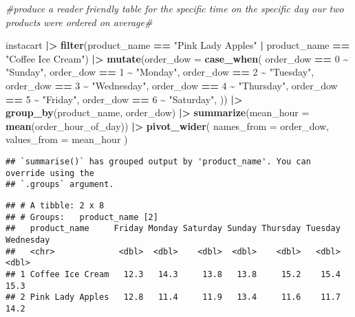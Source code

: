 \documentclass[
]{article}
\newenvironment{Shaded}{\begin{snugshade}}{\end{snugshade}}
\newcommand{\AttributeTok}[1]{\textcolor[rgb]{0.13,0.29,0.53}{#1}}
\newcommand{\CommentTok}[1]{\textcolor[rgb]{0.56,0.35,0.01}{\textit{#1}}}
\newcommand{\DecValTok}[1]{\textcolor[rgb]{0.00,0.00,0.81}{#1}}
\newcommand{\FunctionTok}[1]{\textcolor[rgb]{0.13,0.29,0.53}{\textbf{#1}}}
\newcommand{\NormalTok}[1]{#1}
\newcommand{\SpecialCharTok}[1]{\textcolor[rgb]{0.81,0.36,0.00}{\textbf{#1}}}
\newcommand{\StringTok}[1]{\textcolor[rgb]{0.31,0.60,0.02}{#1}}
\begin{document}
\begin{Shaded}
\begin{Highlighting}[]
\CommentTok{\#produce a reader friendly table for the specific time on the specific day our two products were ordered on average\#}

\NormalTok{instacart }\SpecialCharTok{|\textgreater{}} \FunctionTok{filter}\NormalTok{(product\_name }\SpecialCharTok{==} \StringTok{"Pink Lady Apples"} \SpecialCharTok{|}\NormalTok{ product\_name }\SpecialCharTok{==} \StringTok{"Coffee Ice Cream"}\NormalTok{) }\SpecialCharTok{|\textgreater{}} \FunctionTok{mutate}\NormalTok{(}\AttributeTok{order\_dow =} \FunctionTok{case\_when}\NormalTok{(}
\NormalTok{            order\_dow }\SpecialCharTok{==} \DecValTok{0} \SpecialCharTok{\textasciitilde{}} \StringTok{"Sunday"}\NormalTok{,}
\NormalTok{            order\_dow }\SpecialCharTok{==} \DecValTok{1} \SpecialCharTok{\textasciitilde{}} \StringTok{"Monday"}\NormalTok{,}
\NormalTok{            order\_dow }\SpecialCharTok{==} \DecValTok{2} \SpecialCharTok{\textasciitilde{}} \StringTok{"Tuesday"}\NormalTok{,}
\NormalTok{            order\_dow }\SpecialCharTok{==} \DecValTok{3} \SpecialCharTok{\textasciitilde{}} \StringTok{"Wednesday"}\NormalTok{,}
\NormalTok{            order\_dow }\SpecialCharTok{==} \DecValTok{4} \SpecialCharTok{\textasciitilde{}} \StringTok{"Thursday"}\NormalTok{,}
\NormalTok{            order\_dow }\SpecialCharTok{==} \DecValTok{5} \SpecialCharTok{\textasciitilde{}} \StringTok{"Friday"}\NormalTok{,}
\NormalTok{            order\_dow }\SpecialCharTok{==} \DecValTok{6} \SpecialCharTok{\textasciitilde{}} \StringTok{"Saturday"}\NormalTok{,}
\NormalTok{          )) }\SpecialCharTok{|\textgreater{}} \FunctionTok{group\_by}\NormalTok{(product\_name, order\_dow) }\SpecialCharTok{|\textgreater{}}
          \FunctionTok{summarize}\NormalTok{(}\AttributeTok{mean\_hour =} \FunctionTok{mean}\NormalTok{(order\_hour\_of\_day)) }\SpecialCharTok{|\textgreater{}}
          \FunctionTok{pivot\_wider}\NormalTok{(}
            \AttributeTok{names\_from =}\NormalTok{ order\_dow,}
            \AttributeTok{values\_from =}\NormalTok{ mean\_hour}
\NormalTok{          )}
\end{Highlighting}
\end{Shaded}

\begin{verbatim}
## `summarise()` has grouped output by 'product_name'. You can override using the
## `.groups` argument.
\end{verbatim}

\begin{verbatim}
## # A tibble: 2 x 8
## # Groups:   product_name [2]
##   product_name     Friday Monday Saturday Sunday Thursday Tuesday Wednesday
##   <chr>             <dbl>  <dbl>    <dbl>  <dbl>    <dbl>   <dbl>     <dbl>
## 1 Coffee Ice Cream   12.3   14.3     13.8   13.8     15.2    15.4      15.3
## 2 Pink Lady Apples   12.8   11.4     11.9   13.4     11.6    11.7      14.2
\end{verbatim}
\end{document}
